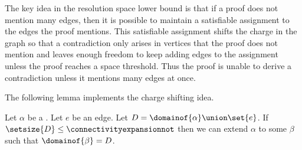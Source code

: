The key idea in the resolution space lower bound is that if a proof does not mention many edges, then it is possible to maintain a satisfiable assignment to the edges the proof mentions. This satisfiable assignment shifts the charge in the graph so that a contradiction only arises in vertices that the proof does not mention and leaves enough freedom to keep adding edges to the assignment unless the proof reaches a space threshold. Thus the proof is unable to derive a contradiction unless it mentions many edges at once.

The following lemma implements the charge shifting idea. 

\begin{lemma}
  \label{lem:extend-non-splitting}
  Let $\alpha$ be a \nonsplittingassignment. Let $e$ be an edge. Let $D=\domainof{\alpha}\union\set{e}$. If $\setsize{D}\leq \connectivityexpansionnot$ then we can extend $\alpha$ to some \nonsplittingassignment $\beta$ such that $\domainof{\beta}=D$.
\end{lemma}

